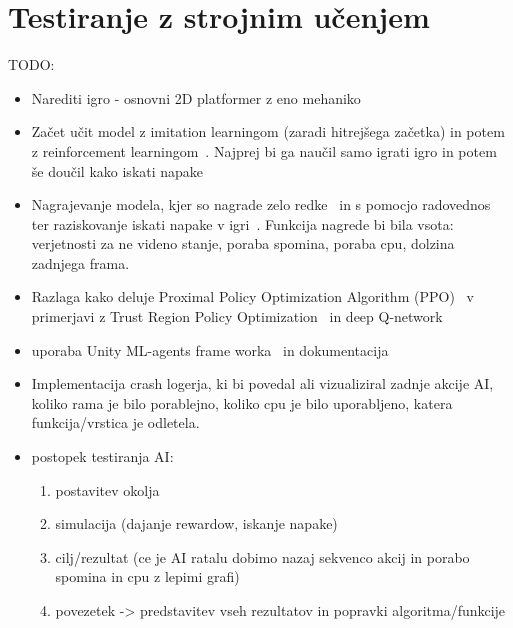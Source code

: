 \chapter{Testiranje z strojnim učenjem}
TODO:
\begin{itemize}
    \item Narediti igro - osnovni 2D platformer z eno mehaniko
    \item Začet učit model z imitation learningom (zaradi hitrejšega začetka) in potem z reinforcement learningom~\cite{DBLP:journals/corr/abs-1803-05402}. Najprej bi ga naučil samo igrati igro in potem še doučil kako iskati napake
    \item Nagrajevanje modela, kjer so nagrade zelo redke~\cite{Ng99policyinvariance} in s pomocjo radovednos ter raziskovanje iskati napake v igri~\cite{pathakICMl17curiosity}. Funkcija nagrede bi bila vsota: verjetnosti za ne videno stanje, poraba spomina, poraba cpu, dolzina zadnjega frama. 
    \item Razlaga kako deluje Proximal Policy Optimization Algorithm (PPO)~\cite{DBLP:journals/corr/SchulmanWDRK17} v primerjavi z Trust Region Policy Optimization~\cite{DBLP:journals/corr/SchulmanLMJA15} in deep Q-network~\cite{deep-reinforcement-learning}
    \item uporaba Unity ML-agents frame worka~\cite{DBLP:journals/corr/abs-1809-02627} in dokumentacija~\cite{Unity-ML-Agents}
    \item Implementacija crash logerja, ki bi povedal ali vizualiziral zadnje akcije AI, koliko rama je bilo porablejno, koliko cpu je bilo uporabljeno, katera funkcija/vrstica je odletela.
    \item postopek testiranja AI:
    \begin{enumerate}
        \item postavitev okolja
        \item simulacija (dajanje rewardow, iskanje napake)
        \item cilj/rezultat (ce je AI ratalu dobimo nazaj sekvenco akcij in porabo spomina in cpu z lepimi grafi)
        \item povezetek -> predstavitev vseh rezultatov in popravki algoritma/funkcije
    \end{enumerate}
\end{itemize}

